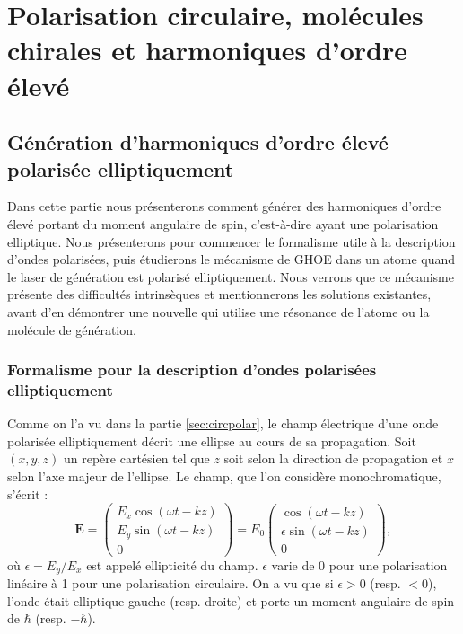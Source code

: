 \part{Polarisation circulaire, molécules chirales et harmoniques d'ordre élevé}
\label{PA:Spin_HHG}
\chapter{Génération d'harmoniques d'ordre élevé polarisée elliptiquement}
\label{CH:Circular_HHG}
Dans cette partie nous présenterons comment générer des harmoniques d'ordre élevé portant du moment angulaire de spin, c'est-à-dire ayant une polarisation elliptique. Nous présenterons pour commencer le formalisme utile à la description d'ondes polarisées, puis étudierons le mécanisme de GHOE dans un atome quand le laser de génération est polarisé elliptiquement. Nous verrons que ce mécanisme présente des difficultés intrinsèques et mentionnerons les solutions existantes, avant d'en démontrer une nouvelle qui utilise une résonance de l'atome ou la molécule de génération.

\section{Formalisme pour la description d'ondes polarisées elliptiquement}
Comme on l'a vu dans la partie \ref{sec:circpolar}, le champ électrique d'une onde polarisée elliptiquement décrit une ellipse au cours de sa propagation. Soit $(x,y,z)$ un repère cartésien tel que $z$ soit selon la direction de propagation et $x$ selon l'axe majeur de l'ellipse. Le champ, que l'on considère monochromatique, s'écrit :
\begin{equation}
\bm{E}=\begin{pmatrix}
E_{x}\cos{(\omega t-kz)}\\
E_{y}\sin{(\omega t-kz)}\\
0
\end{pmatrix}=E_{0}
\begin{pmatrix}
\cos{(\omega t-kz)}\\
\epsilon\sin{(\omega t-kz)}\\
0
\end{pmatrix},
\label{eq:jones}
\end{equation}
où $\epsilon = E_{y}/E_{x}$ est appelé ellipticité du champ. $\epsilon$ varie de 0 pour une polarisation linéaire à 1 pour une polarisation circulaire.  On a vu que si $\epsilon>0$ (resp. $<0$), l'onde était elliptique gauche (resp. droite) et porte un moment angulaire de spin de $\hbar$ (resp. $-\hbar$). 

